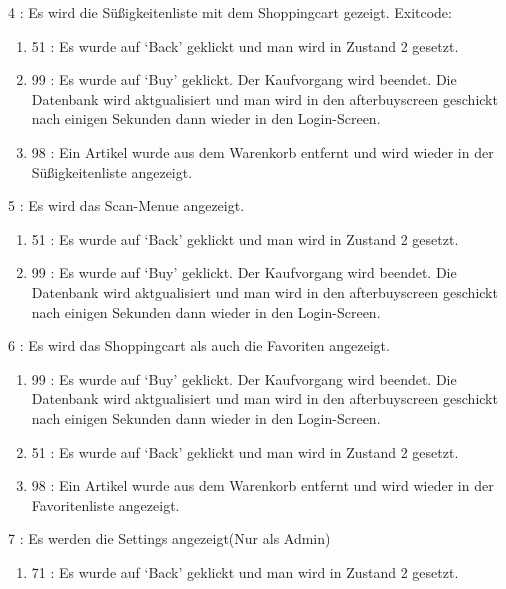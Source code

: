 \documentclass[11pt,a4paper]{article} %
\begin{document}
		4 : Es wird die Süßigkeitenliste mit dem Shoppingcart gezeigt. 
			Exitcode:
\begin{enumerate}			
			\item	51 : Es wurde auf `Back' geklickt und man wird in Zustand 2 gesetzt.
			\item	99 : Es wurde auf `Buy' geklickt. Der Kaufvorgang wird beendet. Die Datenbank wird aktgualisiert und man wird in den afterbuyscreen geschickt nach einigen 						Sekunden dann wieder in den Login-Screen.
			\item	98 : Ein Artikel wurde aus dem Warenkorb entfernt und wird wieder in der Süßigkeitenliste angezeigt.
\end{enumerate}			
		5 : Es wird das Scan-Menue angezeigt.
\begin{enumerate}		
			\item	51 : Es wurde auf `Back' geklickt und man wird in Zustand 2 gesetzt.
			\item	99 : Es wurde auf `Buy' geklickt. Der Kaufvorgang wird beendet. Die Datenbank wird aktgualisiert und man wird in den afterbuyscreen geschickt nach einigen 						Sekunden dann wieder in den Login-Screen.
\end{enumerate}		
		6 : Es wird das Shoppingcart als auch die Favoriten angezeigt.
\begin{enumerate}		
			\item	99 : Es wurde auf `Buy' geklickt. Der Kaufvorgang wird beendet. Die Datenbank wird aktgualisiert und man wird in den afterbuyscreen geschickt nach einigen 						Sekunden dann wieder in den Login-Screen.
			\item	51 : Es wurde auf `Back' geklickt und man wird in Zustand 2 gesetzt.
			\item	98 : Ein Artikel wurde aus dem Warenkorb entfernt und wird wieder in der Favoritenliste angezeigt.
\end{enumerate}				
		7 : Es werden die Settings angezeigt(Nur als Admin)
\begin{enumerate}		
			\item	71 : Es wurde auf `Back' geklickt und man wird in Zustand 2 gesetzt.
\end{enumerate}
\end{document}
